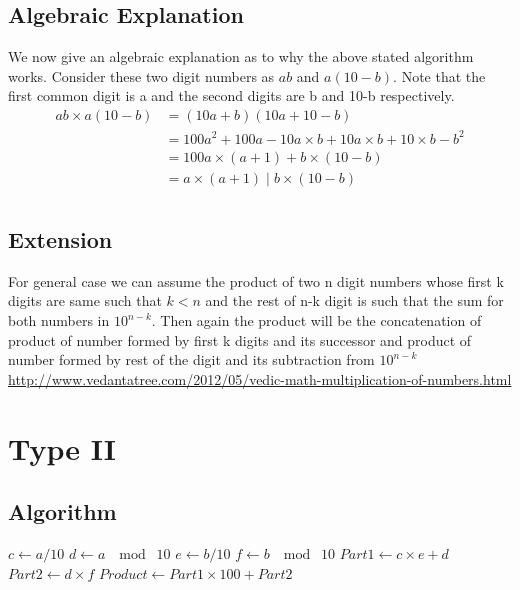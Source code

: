 \documentclass{article}
\begin{document}
\subsection{Algebraic Explanation}
We now give an algebraic explanation as to why the above stated algorithm works. Consider these two digit numbers as $ab$ and $a(10-b)$. Note that the first common digit is a and the second digits are b and 10-b respectively.
\begin{align*}
    ab  \times  a(10-b) & = ( 10a + b )( 10a + 10 - b ) \\
                 & = 100a^2 + 100a -10a \times b + 10a \times b + 10 \times b - b^2 \\
                 & = 100a \times (a+1) + b \times (10-b) \\
                 & = a \times (a+1) \; | \; b \times (10-b) \\
\end{align*}

\subsection{Extension}
For general case we can assume the product of two n digit numbers whose first k digits are same such that $k < n$ and the rest of n-k digit is such that the sum for both numbers in $ {10}^{n-k} $. Then again the product will be the concatenation of product of number formed by first k digits and its successor and product of number formed by rest of the digit and its subtraction from $ {10}^{n-k} $
\url {http://www.vedantatree.com/2012/05/vedic-math-multiplication-of-numbers.html}

\section{Type II}
\subsection{Algorithm}
\label{type II:algorithm}
	\begin{algorithm}
		\begin{algorithmic}
				\State $c \gets a/10$ 	
				\State $d \gets a \; \mod \; 10$ 	
				\State $e \gets b/10$ 
				\State $f \gets b \; \mod \; 10$ 	
					\State $Part1 \gets c \times e + d$
					\State $Part2 \gets d \times f$
					\State $Product \gets Part1 \times 100 + Part2$ 
				\Else
				\EndIf
			\EndProcedure
		\end{algorithmic}
	\end{algorithm}
\end{document}
